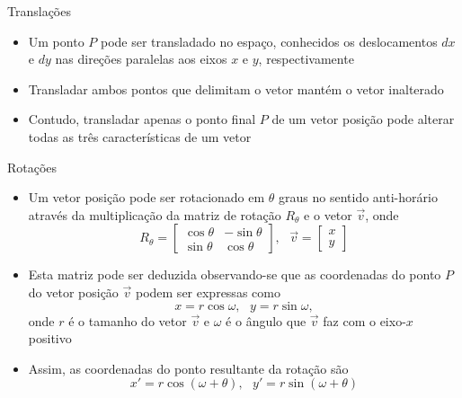 \begin{frame}[fragile]{Translações}

    \begin{itemize}
        \item Um ponto $P$ pode ser transladado no espaço, conhecidos os deslocamentos $dx$ e 
        $dy$ nas direções paralelas aos eixos $x$ e $y$, respectivamente
        \pause

        \item Transladar ambos pontos que delimitam o vetor mantém o vetor inalterado
        \pause

        \item Contudo, transladar apenas o ponto final $P$ de um vetor posição pode alterar todas
            as três características de um vetor
        \pause

    \end{itemize}

\end{frame}

\begin{frame}[fragile]{Rotações}

    \begin{itemize}
        \item Um vetor posição pode ser rotacionado em $\theta$ graus no sentido anti-horário
            através da multiplicação da matriz de rotação $R_\theta$ e o vetor $\vec{v}$, onde
        \[
            R_\theta = \begin{bmatrix} \cos \theta & -\sin \theta \\ \sin \theta & \cos \theta
                \end{bmatrix}, \, \, \, \, \vec{v} = \begin{bmatrix} x \\ y \end{bmatrix}
        \]
        \pause

        \item Esta matriz pode ser deduzida observando-se que as coordenadas do ponto $P$ do
            vetor posição $\vec{v}$ podem ser expressas como 
            \[
                x = r\cos \omega, \, \, \, \, y = r\sin \omega, 
            \]
            onde $r$ é o tamanho do vetor $\vec{v}$ e $\omega$ é o ângulo que $\vec{v}$ faz com
            o eixo-$x$ positivo
        \pause

        \item Assim, as coordenadas do ponto resultante da rotação são 
        \[
            x' = r\cos (\omega + \theta), \, \, \, \, y' = r\sin (\omega + \theta)
        \]

    \end{itemize}

\end{frame}

